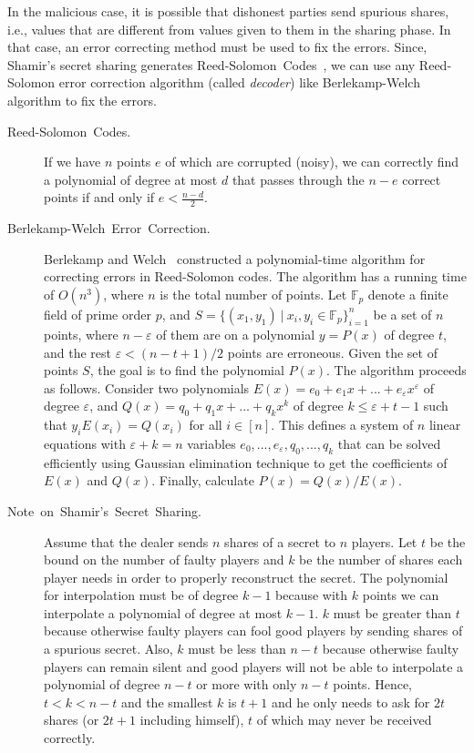 \documentclass[10pt]{article}
\theoremstyle{plain}
\begin{document}
In the malicious case, it is possible that dishonest parties send
spurious shares, i.e., values that are different from values given
to them in the sharing phase. In that case, an error correcting method
must be used to fix the errors. Since, Shamir's secret sharing generates
Reed-Solomon~Codes~\cite{Reed-Solomon1960}, we can use any Reed-Solomon
error correction algorithm (called \emph{decoder}) like Berlekamp-Welch
algorithm to fix the errors.
\begin{description}
	\item [{Reed-Solomon~Codes.}] If we have $n$ points $e$ of which are
	corrupted (noisy), we can correctly find a polynomial of degree at
	most $d$ that passes through the $n-e$ correct points if and only
	if $e<\frac{n-d}{2}$.
	\item [{Berlekamp-Welch~Error~Correction.}] \noindent Berlekamp and Welch~\cite{Berlekamp:Welch:1986}
	constructed a polynomial-time algorithm for correcting errors in Reed-Solomon
	codes. The algorithm has a running time of $O(n^{3})$, where $n$
	is the total number of points. Let $\mathbb{F}_{p}$ denote a finite
	field of prime order $p$, and $S=\{(x_{1},y_{1})\:|\:x_{i},y_{i}\in\mathbb{F}_{p}\}_{i=1}^{n}$
	be a set of $n$ points, where $n-\varepsilon$ of them are on a polynomial
	$y=P(x)$ of degree $t$, and the rest $\varepsilon<(n-t+1)/2$ points
	are erroneous. Given the set of points $S$, the goal is to find the
	polynomial $P(x)$. The algorithm proceeds as follows. Consider two
	polynomials $E(x)=e_{0}+e_{1}x+...+e_{\varepsilon}x^{\varepsilon}$
	of degree $\varepsilon$, and $Q(x)=q_{0}+q_{1}x+...+q_{k}x^{k}$
	of degree $k\leq\varepsilon+t-1$ such that $y_{i}E(x_{i})=Q(x_{i})$
	for all $i\in[n]$. This defines a system of $n$ linear equations
	with $\varepsilon+k=n$ variables $e_{0},...,e_{\varepsilon},q_{0},...,q_{k}$
	that can be solved efficiently using Gaussian elimination technique
	to get the coefficients of $E(x)$ and $Q(x)$. Finally, calculate
	$P(x)=Q(x)/E(x)$.
	\item [{Note~on~Shamir's~Secret~Sharing.}] Assume that the dealer sends
	$n$ shares of a secret to $n$ players. Let $t$ be the bound on
	the number of faulty players and $k$ be the number of shares each
	player needs in order to properly reconstruct the secret. The polynomial
	for interpolation must be of degree $k-1$ because with $k$ points
	we can interpolate a polynomial of degree at most $k-1$. $k$ must
	be greater than $t$ because otherwise faulty players can fool good
	players by sending shares of a spurious secret. Also, $k$ must be
	less than $n-t$ because otherwise faulty players can remain silent
	and good players will not be able to interpolate a polynomial of degree
	$n-t$ or more with only $n-t$ points. Hence, $t<k<n-t$ and the
	smallest $k$ is $t+1$ and he only needs to ask for $2t$ shares
	(or $2t+1$ including himself), $t$ of which may never be received
	correctly.
\end{description}
\end{document}
